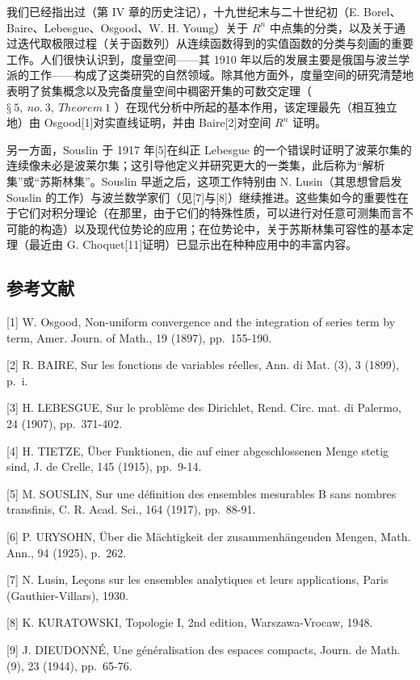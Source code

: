 我们已经指出过（第 IV 章的历史注记），十九世纪末与二十世纪初（E. Borel、Baire、Lebesgue、Osgood、W. H. Young）关于 \(R^{n}\) 中点集的分类，以及关于通过迭代取极限过程（关于函数列）从连续函数得到的实值函数的分类与刻画的重要工作。人们很快认识到，度量空间——其 1910 年以后的发展主要是俄国与波兰学派的工作——构成了这类研究的自然领域。除其他方面外，度量空间的研究清楚地表明了贫集概念以及完备度量空间中稠密开集的可数交定理（ \(§\ 5,\ no.\ 3,\ Theorem\ 1\) ）在现代分析中所起的基本作用，该定理最先（相互独立地）由 Osgood{[}1{]}对实直线证明，并由 Baire{[}2{]}对空间 \(R^{n}\) 证明。

另一方面，Souslin 于 1917 年{[}5{]}在纠正 Lebesgue 的一个错误时证明了波莱尔集的连续像未必是波莱尔集；这引导他定义并研究更大的一类集，此后称为``解析集''或``苏斯林集''。Souslin 早逝之后，这项工作特别由 N. Lusin（其思想曾启发 Souslin 的工作）与波兰数学家们（见{[}7{]}与{[}8{]}）继续推进。这些集如今的重要性在于它们对积分理论（在那里，由于它们的特殊性质，可以进行对任意可测集而言不可能的构造）以及现代位势论的应用；在位势论中，关于苏斯林集可容性的基本定理（最近由 G. Choquet{[}11{]}证明）已显示出在种种应用中的丰富内容。

\subsection*{参考文献}

{[}1{]} W. Osgood, Non-uniform convergence and the integration of series term by term, Amer. Journ. of Math., 19 (1897), pp.~155-190.

{[}2{]} R. BAIRE, Sur les fonctions de variables réelles, Ann. di Mat. (3), 3 (1899), p.~i.

{[}3{]} H. LEBESGUE, Sur le problème des Dirichlet, Rend. Circ. mat. di Palermo, 24 (1907), pp.~371-402.

{[}4{]} H. TIETZE, Über Funktionen, die auf einer abgeschlossenen Menge stetig sind, J. de Crelle, 145 (1915), pp.~9-14.

{[}5{]} M. SOUSLIN, Sur une définition des ensembles mesurables B sans nombres transfinis, C. R. Acad. Sci., 164 (1917), pp.~88-91.

{[}6{]} P. URYSOHN, Über die Mächtigkeit der zusammenhängenden Mengen, Math. Ann., 94 (1925), p.~262.

{[}7{]} N. Lusin, Leçons sur les ensembles analytiques et leurs applications, Paris (Gauthier-Villars), 1930.

{[}8{]} K. KURATOWSKI, Topologie I, 2nd edition, Warszawa-Vrocaw, 1948.

{[}9{]} J. DIEUDONNÉ, Une généralisation des espaces compacts, Journ. de Math. (9), 23 (1944), pp.~65-76.

